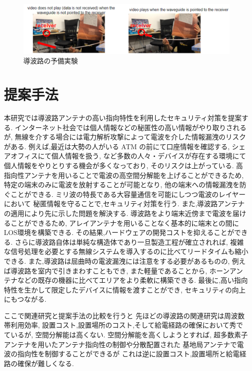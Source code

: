 \documentclass[technicalreport]{ieicej}
\begin{document}
\begin{figure}[t]
  \begin{center}
    \includegraphics[bb=0 0 630.087950 152.271255, width=1.0\linewidth]{img/qualitative_experiment.pdf}
    \caption{導波路の予備実験}
    \label{fig:qualitative_experiment}
  \end{center}
\end{figure}


\section{提案手法}

本研究では導波路アンテナの高い指向特性を利用したセキュリティ対策を提案する.
インターネット社会では個人情報などの秘匿性の高い情報がやり取りされるが,
無線を介する場合には電力解析攻撃によって電波を介した情報漏洩のリスクがある.
例えば,最近は大勢の人がいる ATM の前にて口座情報を確認する,
シェアオフィスにて個人情報を扱う,
など多数の人々・デバイスが存在する環境にて個人情報をやりとりする機会が多くなっており,
そのリスクは上がっている.
高指向性アンテナを用いることで電波の高空間分解能を上げることができるため,
特定の端末のみに電波を放射することが可能となり,
他の端末への情報漏洩を防ぐことができる.
ミリ波の特長である大容量通信を可能にしつつ電波のレイヤーにおいて
秘匿情報を守ることで,セキュリティ対策を行う.
また,導波路アンテナの適用により先に示した問題を解決する.
導波路をより端末近傍まで電波を届けることができるため,
アレイアンテナを用いることなく基本的に端末との間にLOS環境を構築できる.
その結果,ハードウェアの開発コストを抑えることができる.
さらに導波路自体は単純な構造体であり一旦製造工程が確立されれば,
複雑な信号処理を必要とする無線システムを導入するのに比べてリードタイムも縮小できる.
また,導波路は屈曲時の電波漏洩には注意をする必要があるものの,
例えば導波路を室内で引きまわすこともでき,
また軽量であることから,
ホーンアンテナなどの既存の機器に比べてエリアをより柔軟に構築できる.
最後に,高い指向特性を生かして限定したデバイスに情報を渡すことができ,
セキュリティの向上にもつながる.

ここで関連研究と提案手法の比較を行うと
先ほどの導波路の関連研究は周波数帯利用効率,
設置コスト,設置場所のコスト,そして給電経路の確保において秀でているが,
空間分解能は高くない.
空間分解能を高くしようとすれば,
超多数素子アンテナを用いたアンテナ指向性の制御や分散配置された
基地局アンテナで電波の指向性を制御することができるが
これは逆に設置コスト,設置場所と給電経路の確保が難しくなる.
\end{document}
